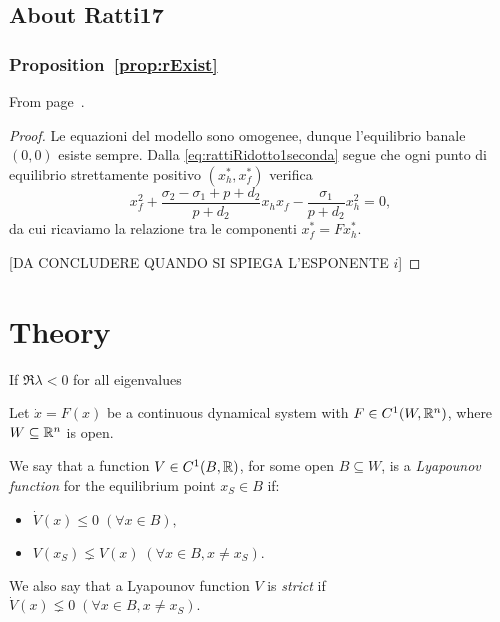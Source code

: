 \section{About Ratti17}
\subsection{ Proposition~\ref{prop:rExist} }
From page~\pageref{prop:rExist}.

\begin{proof}
    Le equazioni del modello sono omogenee, dunque l'equilibrio banale $(0,0)$ esiste sempre.
    Dalla \eqref{eq:rattiRidotto1seconda} segue che ogni punto di equilibrio strettamente positivo $(x_h^*, x_f^*)$ verifica
    $$x_f^2 + \frac{\sigma_2 - \sigma_1 + p + d_2}{p +d_2} x_h x_f - \frac{\sigma_1}{p+d_2} x_h^2 = 0,$$
    da cui ricaviamo la relazione tra le componenti $x_f^* = F x_h^*$.

    [DA CONCLUDERE QUANDO SI SPIEGA L'ESPONENTE $i$] %
\end{proof}








\chapter{Theory}

\begin{teorema}
    If $\Re{\lambda} < 0$ for all eigenvalues \omissis %

    \label{teo:pozzoLineare}
\end{teorema}


\begin{definizione}
    Let $\dot{x} = F(x)$ be a continuous dynamical system with $F \in C^1(W,\mathbb{R}^n)$, where $W \subseteq \mathbb{R}^n$ is open.

    We say that a function $V \in C^1(B, \mathbb{R})$, for some open $B \subseteq W$, is a \emph{Lyapounov function} for the equilibrium point $x_S \in B$ if:
    \begin{itemize}
        \item $\dot{V} (x) \leq 0 \; (\forall x \in B),$
        \item $V(x_S) \lneq V(x) \; (\forall x \in B, x \neq x_S).$
    \end{itemize}

    We also say that a Lyapounov function $V$ is \emph{strict} if $\dot{V}(x) \lneq 0 \; (\forall x \in B, x \neq x_S)$.
\end{definizione}


\begin{teorema}

    \label{teo:lyapounovFunc}
\end{teorema}

\begin{corollario}

\end{corollario}
